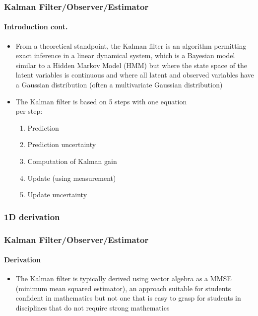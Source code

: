 \begin{frame}\pw\Large
\frametitle{Kalman Filter/Observer/Estimator}
\framesubtitle{Introduction \tiny cont.}

\scriptsize
\begin{itemize}
\item From a theoretical standpoint, the Kalman filter is an algorithm permitting exact inference in a linear dynamical system, which is a Bayesian model similar to a Hidden Markov Model (HMM) but where the state space of the latent variables is continuous and where all latent and observed variables have a Gaussian distribution (often a multivariate Gaussian distribution)
\item The Kalman filter is based on 5 steps with one equation \\per step:
\begin{enumerate}\scriptsize 
\item {\color{red}Prediction}
\item {\color{red}Prediction uncertainty}
\item Computation of {\color{orange}Kalman gain}
\item {\color{darkgreen}Update} (using {\color{blue}measurement})
\item {\color{darkgreen}Update uncertainty}
\end{enumerate}\scriptsize 
\end{itemize}
\end{frame}

\subsubsection{1D derivation}
\begin{frame}\pw\Large
\frametitle{Kalman Filter/Observer/Estimator}
\framesubtitle{Derivation}

\scriptsize
\begin{itemize}
\item The Kalman filter is typically derived using vector algebra as a MMSE (minimum mean squared estimator), an approach suitable for students confident in mathematics but not one that is easy to grasp for students in disciplines that do not require strong mathematics
\end{itemize}
\end{frame}


